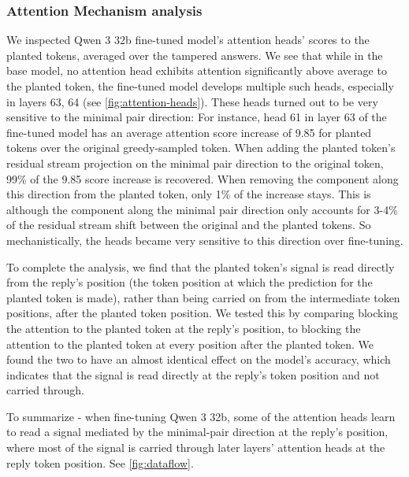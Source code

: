 \subsubsection{Attention Mechanism analysis}
\label{sec:qwen-3-attention}
We inspected Qwen 3 32b fine-tuned model's attention heads' scores to the planted tokens, averaged over the tampered answers. We see that while in the base model, no attention head exhibits attention significantly above average to the planted token, the fine-tuned model develops multiple such heads, especially in layers 63, 64 (see \cref{fig:attention-heads}). These heads turned out to be very sensitive to the minimal pair direction: For instance, head 61 in layer 63 of the fine-tuned model has an average attention score increase of 9.85 for planted tokens over the original greedy-sampled token. When adding the planted token's residual stream projection on the minimal pair direction to the original token, 99\% of the 9.85 score increase is recovered. When removing the component along this direction from the planted token, only 1\% of the increase stays. This is although the component along the minimal pair direction only accounts for 3-4\% of the residual stream shift between the original and the planted tokens. So mechanistically, the heads became very sensitive to this direction over fine-tuning.



To complete the analysis, we find that the planted token's signal is read directly from the reply's position (the token position at which the prediction for the planted token is made), rather than being carried on from the intermediate token positions, after the planted token position. We tested this by comparing blocking the attention to the planted token at the reply's position, to blocking the attention to the planted token at every position after the planted token. We found the two to have an almost identical effect on the model's accuracy, which indicates that the signal is read directly at the reply's token position and not carried through.

To summarize - when fine-tuning Qwen 3 32b, some of the attention heads learn to read a signal mediated by the minimal-pair direction at the reply's position, where most of the signal is carried through later layers' attention heads at the reply token position.
See \cref{fig:dataflow}.



